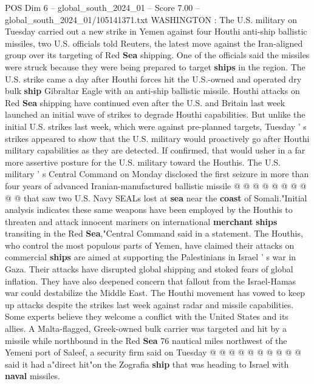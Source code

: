 \begin{textsample}{POS Dim 6 – global\_south\_2024\_01 – Score 7.00 – global\_south\_2024\_01/105141371.txt}  \label{ex:f6_pos_089}
WASHINGTON : The U.S. military on Tuesday carried out a new strike in Yemen against four Houthi anti-ship ballistic missiles, two U.S. officials told Reuters, the latest move against the Iran-aligned group over its targeting of Red \textbf{Sea} shipping.
One of the officials said the missiles were struck because they were being prepared to target \textbf{ships} in the region.
The U.S. strike came a day after Houthi forces hit the U.S.-owned and operated dry bulk \textbf{ship} Gibraltar Eagle with an anti-ship ballistic missile.
Houthi attacks on Red \textbf{Sea} shipping have continued even after the U.S. and Britain last week launched an initial wave of strikes to degrade Houthi capabilities.
But unlike the initial U.S. strikes last week, which were against pre-planned targets, Tuesday ' s strikes appeared to show that the U.S. military would proactively go after Houthi military capabilities as they are detected.
If confirmed, that would usher in a far more assertive posture for the U.S. military toward the Houthis.
The U.S. military ' s Central Command on Monday disclosed the first seizure in more than four years of advanced Iranian-manufactured ballistic missile @ @ @ @ @ @ @ @ @ @ that saw two U.S.
Navy SEALs lost at \textbf{sea} near the \textbf{coast} of Somali."Initial analysis indicates these same weapons have been employed by the Houthis to threaten and attack innocent mariners on international \textbf{merchant} \textbf{ships} transiting in the Red \textbf{Sea},"Central Command said in a statement.
The Houthis, who control the most populous parts of Yemen, have claimed their attacks on commercial \textbf{ships} are aimed at supporting the Palestinians in Israel ' s war in Gaza.
Their attacks have disrupted global shipping and stoked fears of global inflation.
They have also deepened concern that fallout from the Israel-Hamas war could destabilize the Middle East.
The Houthi movement has vowed to keep up attacks despite the strikes last week against radar and missile capabilities.
Some experts believe they welcome a conflict with the United States and its allies.
A Malta-flagged, Greek-owned bulk carrier was targeted and hit by a missile while northbound in the Red \textbf{Sea} 76 nautical miles northwest of the Yemeni port of Saleef, a security firm said on Tuesday @ @ @ @ @ @ @ @ @ @ said it had a"direct hit"on the Zografia \textbf{ship} that was heading to Israel with \textbf{naval} missiles.

\end{textsample}
